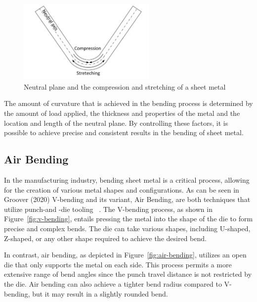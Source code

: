 \begin{figure}[h]
    \begin{tcolorbox}[arc=0pt,boxrule=0.5pt, colback=white]
        \centering
        \includegraphics[width=0.6\textwidth]{chap2/images/neutral-plane}
    \end{tcolorbox}
    \caption{Neutral plane and the compression and stretching of a sheet metal
    ~\cite[p. 3]{baig2021machine}}
    \label{fig:neutral-plane}
\end{figure}

The amount of curvature that is achieved in the bending process is determined by the
amount of load applied, the thickness and properties of the metal and the location and length of the neutral plane.
By controlling these factors, it is possible to achieve precise and consistent results in the bending of sheet metal.

\subsection{Air Bending}\label{subsec:air-bending}
In the manufacturing industry, bending sheet metal is a critical process, allowing for the creation of various metal
shapes and configurations.
As can be seen in Groover (2020) V-bending and its variant, Air Bending, are both techniques that utilize punch-and
-die tooling ~\cite[p. 416]{groover2020fundamentals}.
The V-bending process, as shown in Figure~\ref{fig:v-bending}, entails pressing the metal into the shape of the die
to form precise and complex bends.
The die can take various shapes, including U-shaped, Z-shaped, or any other shape required to achieve the desired bend.

In contrast, air bending, as depicted in Figure~\ref{fig:air-bending}, utilizes an open die that only supports the
metal on each side.
This process permits a more extensive range of bend angles since the punch travel distance is not
restricted by the die.
Air bending can also achieve a tighter bend radius compared to V-bending, but it may result in
a slightly rounded bend.

